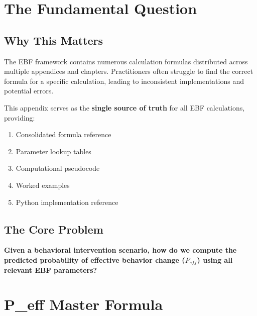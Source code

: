 
\section{The Fundamental Question}
\label{sec:calc-fundamental}

\subsection{Why This Matters}

The EBF framework contains numerous calculation formulas distributed across
multiple appendices and chapters. Practitioners often struggle to find the
correct formula for a specific calculation, leading to inconsistent
implementations and potential errors.

This appendix serves as the \textbf{single source of truth} for all EBF
calculations, providing:
\begin{enumerate}
\item Consolidated formula reference
\item Parameter lookup tables
\item Computational pseudocode
\item Worked examples
\item Python implementation reference
\end{enumerate}

\subsection{The Core Problem}

\begin{tcolorbox}[colback=red!5!white, colframe=red!75!black,
    title=The Fundamental Question]
\textbf{Given a behavioral intervention scenario, how do we compute the predicted
probability of effective behavior change ($P_{eff}$) using all relevant EBF parameters?}
\end{tcolorbox}


\section{P\_eff Master Formula}
\label{sec:calc-peff}

